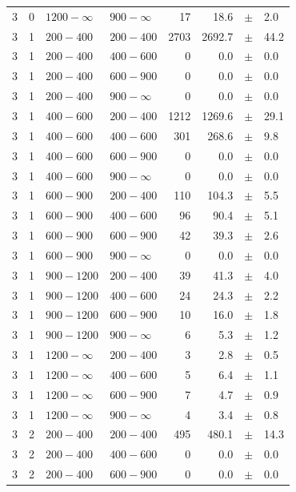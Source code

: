 \begin{table}[!h]
\begin{tabular}{rrllrrcl}
3 & 0 & $1200- \infty$ & $900-\infty$ &     17 &     18.6 &$\pm$&    2.0 \\
3 & 1 & $ 200- 400$ & $200-400$ &   2703 &   2692.7 &$\pm$&   44.2 \\
3 & 1 & $ 200- 400$ & $400-600$ &      0 &      0.0 &$\pm$&    0.0 \\
3 & 1 & $ 200- 400$ & $600-900$ &      0 &      0.0 &$\pm$&    0.0 \\
3 & 1 & $ 200- 400$ & $900-\infty$ &      0 &      0.0 &$\pm$&    0.0 \\
3 & 1 & $ 400- 600$ & $200-400$ &   1212 &   1269.6 &$\pm$&   29.1 \\
3 & 1 & $ 400- 600$ & $400-600$ &    301 &    268.6 &$\pm$&    9.8 \\
3 & 1 & $ 400- 600$ & $600-900$ &      0 &      0.0 &$\pm$&    0.0 \\
3 & 1 & $ 400- 600$ & $900-\infty$ &      0 &      0.0 &$\pm$&    0.0 \\
3 & 1 & $ 600- 900$ & $200-400$ &    110 &    104.3 &$\pm$&    5.5 \\
3 & 1 & $ 600- 900$ & $400-600$ &     96 &     90.4 &$\pm$&    5.1 \\
3 & 1 & $ 600- 900$ & $600-900$ &     42 &     39.3 &$\pm$&    2.6 \\
3 & 1 & $ 600- 900$ & $900-\infty$ &      0 &      0.0 &$\pm$&    0.0 \\
3 & 1 & $ 900-1200$ & $200-400$ &     39 &     41.3 &$\pm$&    4.0 \\
3 & 1 & $ 900-1200$ & $400-600$ &     24 &     24.3 &$\pm$&    2.2 \\
3 & 1 & $ 900-1200$ & $600-900$ &     10 &     16.0 &$\pm$&    1.8 \\
3 & 1 & $ 900-1200$ & $900-\infty$ &      6 &      5.3 &$\pm$&    1.2 \\
3 & 1 & $1200- \infty$ & $200-400$ &      3 &      2.8 &$\pm$&    0.5 \\
3 & 1 & $1200- \infty$ & $400-600$ &      5 &      6.4 &$\pm$&    1.1 \\
3 & 1 & $1200- \infty$ & $600-900$ &      7 &      4.7 &$\pm$&    0.9 \\
3 & 1 & $1200- \infty$ & $900-\infty$ &      4 &      3.4 &$\pm$&    0.8 \\
3 & 2 & $ 200- 400$ & $200-400$ &    495 &    480.1 &$\pm$&   14.3 \\
3 & 2 & $ 200- 400$ & $400-600$ &      0 &      0.0 &$\pm$&    0.0 \\
3 & 2 & $ 200- 400$ & $600-900$ &      0 &      0.0 &$\pm$&    0.0 \\

\end{tabular}
\end{table}
